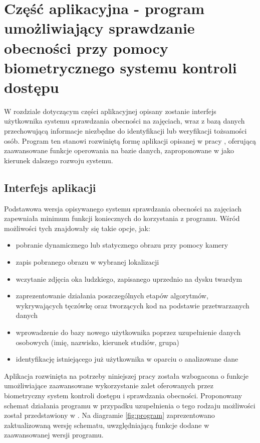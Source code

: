 \chapter{Część aplikacyjna - program umożliwiający sprawdzanie obecności przy pomocy biometrycznego systemu kontroli dostępu}
\label{cha:systemKontroli}

W rozdziale dotyczącym części aplikacyjnej opisany zostanie interfejs użytkownika systemu sprawdzania obecności na zajęciach, wraz z bazą danych przechowującą informacje niezbędne do identyfikacji lub weryfikacji tożsamości osób. Program ten stanowi rozwiniętą formę aplikacji opisanej w pracy \cite{Gl11}, oferującą zaawansowane funkcje operowania na bazie danych, zaproponowane w \cite{Gl11} jako kierunek dalszego rozwoju systemu.

\section{Interfejs aplikacji}
\label{sec:aplikacja}

Podstawowa wersja opisywanego systemu sprawdzania obecności na zajęciach zapewniała minimum funkcji koniecznych do korzystania z programu. Wśród możliwości tych znajdowały się takie opcje, jak:
\begin{itemize}
\item pobranie dynamicznego lub statycznego obrazu przy pomocy kamery
\item zapis pobranego obrazu w wybranej lokalizacji
\item wczytanie zdjęcia oka ludzkiego, zapisanego uprzednio na dysku twardym
\item zaprezentowanie działania poszczególnych etapów algorytmów, wykrywających tęczówkę oraz tworzących kod na podstawie przetwarzanych danych
\item wprowadzenie do bazy nowego użytkownika poprzez uzupełnienie danych osobowych (imię, nazwisko, kierunek studiów, grupa)
\item identyfikację istniejącego już użytkownika w oparciu o analizowane dane
\end{itemize}

Aplikacja rozwinięta na potrzeby niniejszej pracy została wzbogacona o funkcje umożliwiające zaawansowane wykorzystanie zalet oferowanych przez biometryczny system kontroli dostępu i sprawdzania obecności. Proponowany schemat działania programu w przypadku uzupełnienia o tego rodzaju możliwości został przedstawiony w \cite{Gl11}. Na diagramie \ref{fig:program} zaprezentowano zaktualizowaną wersję schematu, uwzględniającą funkcje dodane w zaawansowanej wersji programu.

